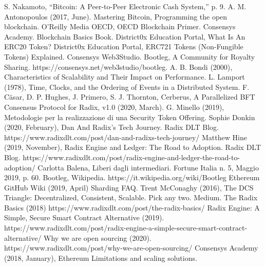 \begin{thebibliography}{90}             %
\rhead[\fancyplain{}{\bfseries \leftmark}]{\fancyplain{}{\bfseries
\thepage}}

 S. Nakamoto, “Bitcoin: A Peer-to-Peer Electronic Cash System,” p. 9.
 A. M. Antonopoulos (2017, June). Mastering Bitcoin, Programming the open blockchain. O'Reilly Media
 OECD, OECD Blockchain Primer.
 Consensys Academy. Blockchain Basics Book.
 District0x Education Portal, What Is An ERC20 Token?
 District0x Education Portal, ERC721 Tokens (Non-Fungible Tokens) Explained.
 Consensys Web3Studio. Bootleg, A Community for Royalty Sharing. https://consensys.net/web3studio/bootleg.
 A. B. Bondi (2000), Characteristics of Scalability and Their Impact on Performance.
 L. Lamport (1978), Time, Clocks, and the Ordering of Events in a Distributed System.
 F. C{\"a}sar, D. P. Hughes, J. Primero, S. J. Thornton, Cerberus, A Parallelized BFT Consensus Protocol for Radix, v1.0 (2020, March).
 G. Minello (2019), Metodologie per la realizzazione di una Security Token Offering.
 Sophie Donkin (2020, February), Dan And Radix's Tech Journey. Radix DLT Blog. https://www.radixdlt.com/post/dan-and-radixs-tech-journey/
 Matthew Hine (2019, November), Radix Engine and Ledger: The Road to Adoption. Radix DLT Blog. https://www.radixdlt.com/post/radix-engine-and-ledger-the-road-to-adoption/
 Carlotta Balena, Liberi dagli intermediari. Fortune Italia n. 5, Maggio 2019, p. 60.
 Bootleg, Wikipedia.  https://it.wikipedia.org/wiki/Bootleg
 Ethereum GitHub Wiki (2019, April) Sharding FAQ.
 Trent McConaghy (2016), The DCS Triangle: Decentralized, Consistent, Scalable. Pick any two. Medium.
 The Radix Basics (2018) https://www.radixdlt.com/post/the-radix-basics/
 Radix Engine: A Simple, Secure Smart Contract Alternative (2019). https://www.radixdlt.com/post/radix-engine-a-simple-secure-smart-contract-alternative/
 Why we are open sourcing (2020). https://www.radixdlt.com/post/why-we-are-open-sourcing/
 Consensys Academy (2018, January), Ethereum Limitations and scaling solutions.

\end{thebibliography}